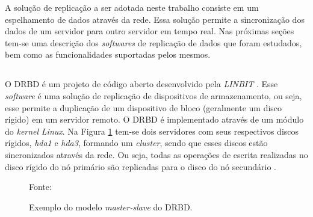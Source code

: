A solução de replicação a ser adotada neste trabalho consiste em um espelhamento de dados através da rede. Essa solução permite a sincronização 
dos dados de um servidor para outro servidor em tempo real.
Nas próximas seções tem-se uma descrição dos \textit{softwares} de replicação de dados que foram estudados, bem como as funcionalidades 
suportadas pelos mesmos.


\subsection{}
\label{section:drbd}
O \ac{DRBD} é um projeto de código aberto desenvolvido pela \textit{LINBIT} \cite{drbd}.
Esse \textit{software} é uma solução de replicação de dispositivos de armazenamento, ou seja, esse permite a duplicação de um dispositivo de bloco 
(geralmente um disco rígido) em um servidor remoto. O \ac{DRBD} é implementado através de um módulo do \textit{kernel} \textit{Linux}. 
Na Figura \ref{fig:drbd_basic} tem-se dois servidores com seus respectivos discos rígidos, \textit{hda1} e 
\textit{hda3}, formando um \textit{cluster}, sendo que esses discos estão sincronizados através da rede. Ou seja, todas as operações de escrita 
realizadas no disco rígido do nó primário são replicadas para o disco do nó secundário \cite{zaminhani2008}.

\begin{figure}[h!]
 \centering
 \caption{Exemplo do modelo \textit{master-slave} do \ac{DRBD}.}
 Fonte: \citet{jones2010}
 \label{fig:drbd_basic}
\end{figure}

